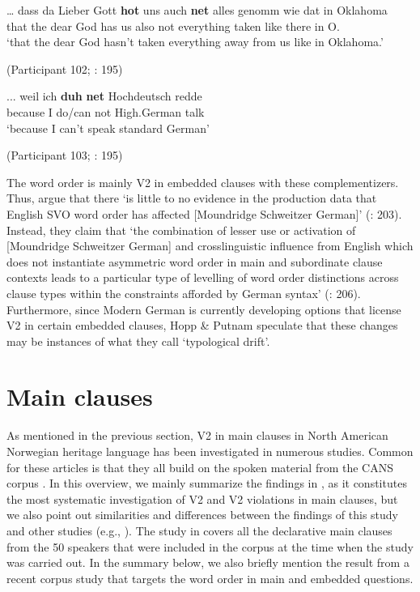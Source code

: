\documentclass[output=paper]{langscibook}
\begin{document}
\ea%
    \label{ex:anderssen:7}
    \gll … dass da  Lieber Gott \textbf{hot}  uns auch \textbf{net} alles          genomm wie dat    in Oklahoma\\
	   {}  that the dear    God  has           us also  not         everything     taken  like there in O.\\
\glt  ‘that the dear God hasn’t taken everything away from us like in Oklahoma.’

(Participant 102; \citealt{HoppPutnam2015}: 195)
\z

\ea%
    \label{ex:anderssen:8}
    \gll ... weil        ich \textbf{duh}      \textbf{net} Hochdeutsch  redde\\
         {}   because    I     {do/can}          not         High.German talk\\
\glt  ‘because I can’t speak standard German’

(Participant 103; \citealt{HoppPutnam2015}: 195)
\z

The word order is mainly V2 in embedded clauses with these complementizers. Thus, \citet{HoppPutnam2015} argue that there ‘is little to no evidence in the production data that English SVO word order has affected [Moundridge Schweitzer German]’ (\citealt{HoppPutnam2015}: 203). Instead, they claim that ‘the combination of lesser use or activation of [Moundridge Schweitzer German] and crosslinguistic influence from English which does not instantiate asymmetric word order in main and subordinate clause contexts leads to a particular type of levelling of word order distinctions across clause types within the constraints afforded by German syntax’ (\citealt{HoppPutnam2015}: 206). Furthermore, since Modern German is currently developing options that license V2 in certain embedded clauses, Hopp \& Putnam speculate that these changes may be instances of what they call ‘typological drift’.

\section{Main clauses}
\label{sec:anderssen:3}
As mentioned in the previous section, V2 in main clauses in North American Norwegian heritage language has been investigated in numerous studies. Common for these articles is that they all build on the spoken material from the CANS corpus \citep{Johannessen2015CANS}. In this overview, we mainly summarize the findings in \citet{WestergaardEtAl2021}, as it constitutes the most systematic investigation of V2 and V2 violations in main clauses, but we also point out similarities and differences between the findings of this study and other studies (e.g., \citealt{Strømsvåg2013, EideHjelde2018, Johannessen2015Germanic, Khayitova2016}). The study in \citet{WestergaardEtAl2021} covers all the declarative main clauses from the 50 speakers that were included in the corpus at the time when the study was carried out. In the summary below, we also briefly mention the result from a recent corpus study that targets the word order in main and embedded questions.\largerpage
\end{document}
